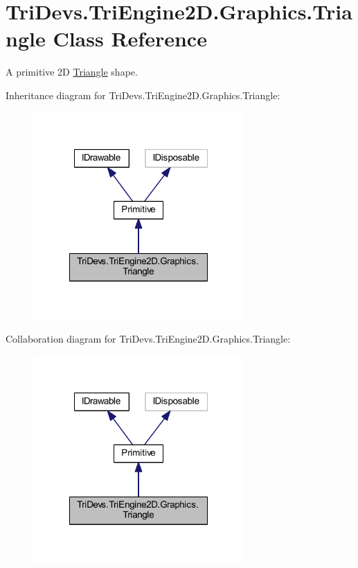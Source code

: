 \hypertarget{class_tri_devs_1_1_tri_engine2_d_1_1_graphics_1_1_triangle}{\section{Tri\-Devs.\-Tri\-Engine2\-D.\-Graphics.\-Triangle Class Reference}
\label{class_tri_devs_1_1_tri_engine2_d_1_1_graphics_1_1_triangle}
}


A primitive 2\-D \hyperlink{class_tri_devs_1_1_tri_engine2_d_1_1_graphics_1_1_triangle}{Triangle} shape.  




Inheritance diagram for Tri\-Devs.\-Tri\-Engine2\-D.\-Graphics.\-Triangle\-:
\nopagebreak
\begin{figure}[H]
\begin{center}
\leavevmode
\includegraphics[width=228pt]{class_tri_devs_1_1_tri_engine2_d_1_1_graphics_1_1_triangle__inherit__graph}
\end{center}
\end{figure}


Collaboration diagram for Tri\-Devs.\-Tri\-Engine2\-D.\-Graphics.\-Triangle\-:
\nopagebreak
\begin{figure}[H]
\begin{center}
\leavevmode
\includegraphics[width=228pt]{class_tri_devs_1_1_tri_engine2_d_1_1_graphics_1_1_triangle__coll__graph}
\end{center}
\end{figure}

